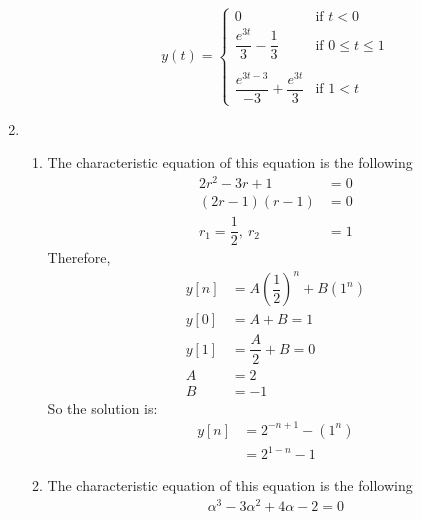 \documentclass[10pt,a4paper, margin=1in]{article}
\begin{document}
\begin{enumerate}
\begin{enumerate}
    	\begin{equation}
		y(t) = \begin{cases}  0 &\mbox{if } t < 0 \\ 
						 \dfrac{e^{3t}}{3} - \dfrac{1}{3}  & \mbox{if } 0 \leq t \leq 1 \\ \\
					 	 \dfrac{e^{3t-3}}{-3} + \dfrac{e^{3t}}{3}& \mbox{if }  1 < t \end{cases}
	\end{equation}
    \end{enumerate}
\newpage
\item %
    \begin{enumerate}
    \item %
    The characteristic equation of this equation is the following
    \begin{equation}
	\begin{split}
		2r^2-3r+1 &= 0 \\
		(2r - 1) (r - 1) &= 0 \\
		r_1 = \dfrac{1}{2}, \ 	r_2 & = 1
	\end{split}	
    \end{equation}
    Therefore,
    \begin{equation}
	\begin{split}
		y[n] & = A(\dfrac{1}{2})^n + B(1^n) \\
		y[0] & = A + B = 1 \\
		y[1] & = \dfrac{A}{2} + B = 0 \\
		A & = 2 \\
		B & = -1 
	\end{split}	
    \end{equation}
    So the solution is: \\
    \begin{equation}
    \begin{split}
	y[n] &= 2^{-n+1} - (1^n) \\
	 &= 2^{1-n} - 1
	\end{split}
    \end{equation}
    \item %
    The characteristic equation of this equation is the following\\
    \begin{equation}
	\begin{split}
	    \alpha ^{3}-3\alpha ^{2}+4\alpha -2 = 0\\

\end{split}
\end{equation}
\end{enumerate}
\end{enumerate}
\end{document}
